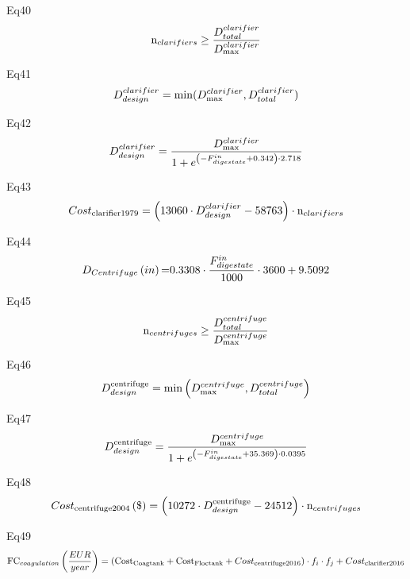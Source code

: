 \documentclass[10pt,a4paper]{article}
\begin{document}
Eq40
\begin{align}
	{{\rm{n}}_{clarifiers}} \ge \frac{{D_{total}^{clarifier}}}{{D_{{\rm{max}}}^{clarifier}}}
\end{align}

Eq41
\begin{align}
	D_{design}^{clarifier} = {\rm{min}}(D_{{\rm{max}}}^{clarifier},D_{total}^{clarifier})
\end{align}

Eq42
\begin{align}
	D_{design}^{clarifier} = \frac{{D_{{\rm{max}}}^{clarifier}}}{{1 + {e^{\left( { - F_{digestate}^{in} + {\rm{0}}{\rm{.342}}} \right) \cdot {\rm{2}}{\rm{.718}}}}}}
\end{align}

Eq43
\begin{align}
	Cos{t_{{\rm{clarifier 1979}}}} = \left( {13060 \cdot D_{design}^{clarifier} - 58763} \right) \cdot {{\rm{n}}_{clarifiers}}
\end{align}

Eq44
\begin{align}
	{D_{Centrifuge}}\left( {in} \right){\rm{ = }}0.3308 \cdot \frac{{F_{digestate}^{in}}}{{1000}} \cdot 3600 + 9.5092
\end{align}

Eq45
\begin{align}
	{{\rm{n}}_{centrifuges}} \ge \frac{{D_{total}^{centrifuge}}}{{D_{{\rm{max}}}^{centrifuge}}}
\end{align}

Eq46
\begin{align}
	D_{design}^{{\rm{centrifuge}}} = \min \left( {D_{{\rm{max}}}^{centrifuge},D_{total}^{centrifuge}} \right)
\end{align}

Eq47
\begin{align}
	D_{design}^{{\rm{centrifuge}}} = \frac{{D_{{\rm{max}}}^{centrifuge}}}{{1 + {e^{\left( { - F_{digestate}^{in} + {\rm{35}}{\rm{.369}}} \right){\rm{\cdot0}}{\rm{.0395}}}}}}
\end{align}

Eq48
\begin{align}
	Cos{t_{{\rm{centrifuge 2004}}}}\left( \$  \right) = \left( {10272 \cdot D_{design}^{{\rm{centrifuge}}} - 24512} \right) \cdot {{\rm{n}}_{centrifuges}}
\end{align}

Eq49
\begin{align}
	{\rm{F}}{{\rm{C}}_{coagulation}}\left( {\frac{EUR }{{year}}} \right) = \left( {{\rm{Cos}}{{\rm{t}}_{{\rm{Coag tank}}}} + {\rm{Cos}}{{\rm{t}}_{{\rm{Floc tank}}}} + Cos{t_{{\rm{centrifuge 2016}}}}} \right) \cdot {f_i} \cdot {f_j} + Cos{t_{{\rm{clarifier 2016}}}}
\end{align}
\end{document}
